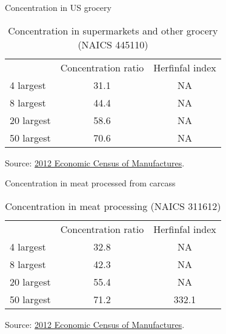 \documentclass[table,xcolor=pdftex,dvipsnames]{beamer}\usepackage[]{graphicx}\usepackage[]{color}
\begin{document}

\begin{frame}{Concentration in US grocery}
\begin{center}
\begin{table}
    \caption{Concentration in supermarkets and other grocery (NAICS 445110)}
    \begin{tabular}{ l  c  c }%
      \toprule
       & Concentration ratio & Herfinfal index \\
      \cmidrule(r){2-3}
      4 largest & 31.1 & NA \\
      8 largest & 44.4 & NA \\
      20 largest & 58.6 & NA \\
      50 largest & 70.6 & NA \\
      \bottomrule
    \end{tabular}
\end{table}
\end{center}
Source: \href{http://factfinder.census.gov/faces/tableservices/jsf/pages/productview.xhtml?pid=ECN_2012_US_44SSSZ6&prodType=table}{2012 Economic Census of Manufactures}.
\end{frame}


\begin{frame}{Concentration in meat processed from carcass}
\begin{center}
\begin{table}
    \caption{Concentration in meat processing (NAICS 311612)}
    \begin{tabular}{ l  c  c }%
      \toprule
       & Concentration ratio & Herfinfal index \\
      \cmidrule(r){2-3}
      4 largest & 32.8 & NA \\
      8 largest & 42.3 & NA \\
      20 largest & 55.4 & NA \\
      50 largest & 71.2 & 332.1 \\
      \bottomrule
    \end{tabular}
\end{table}
\end{center}
Source: \href{http://factfinder.census.gov/faces/tableservices/jsf/pages/productview.xhtml?pid=ECN_2012_US_31SR2&prodType=table}{2012 Economic Census of Manufactures}.
\end{frame}
\end{document}
